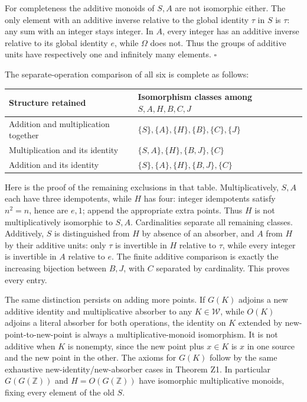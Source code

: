 \documentclass[
]{article}
\newcounter{none} %
\begin{document}
For completeness the additive monoids of \(S,A\) are not isomorphic
either. The only element with an additive inverse relative to the global
identity \(\tau\) in \(S\) is \(\tau\): any sum with an integer stays
integer. In \(A\), every integer has an additive inverse relative to its
global identity \(e\), while \(\Omega\) does not. Thus the groups of
additive units have respectively one and infinitely many elements.
\(\square\)

The separate-operation comparison of all six is complete as follows:

{\def\LTcaptype{none} %
\begin{longtable}[]{@{}
  >{\raggedright\arraybackslash}p{}
  >{\raggedright\arraybackslash}p{}@{}}
\toprule\noalign{}
\begin{minipage}[b]{\linewidth}\raggedright
Structure retained
\end{minipage} & \begin{minipage}[b]{\linewidth}\raggedright
Isomorphism classes among \(S,A,H,B,C,J\)
\end{minipage} \\
\midrule\noalign{}
\endhead
\bottomrule\noalign{}
\endlastfoot
Addition and multiplication together &
\(\{S\},\{A\},\{H\},\{B\},\{C\},\{J\}\) \\
Multiplication and its identity & \(\{S,A\},\{H\},\{B,J\},\{C\}\) \\
Addition and its identity & \(\{S\},\{A\},\{H\},\{B,J\},\{C\}\) \\
\end{longtable}
}

Here is the proof of the remaining exclusions in that table.
Multiplicatively, \(S,A\) each have three idempotents, while \(H\) has
four: integer idempotents satisfy \(n^2=n\), hence are \(e,1\); append
the appropriate extra points. Thus \(H\) is not multiplicatively
isomorphic to \(S,A\). Cardinalities separate all remaining classes.
Additively, \(S\) is distinguished from \(H\) by absence of an absorber,
and \(A\) from \(H\) by their additive units: only \(\tau\) is
invertible in \(H\) relative to \(\tau\), while every integer is
invertible in \(A\) relative to \(e\). The finite additive comparison is
exactly the increasing bijection between \(B,J\), with \(C\) separated
by cardinality. This proves every entry.

The same distinction persists on adding more points. If \(G(K)\) adjoins
a new additive identity and multiplicative absorber to any
\(K\in\mathcal W\), while \(O(K)\) adjoins a literal absorber for both
operations, the identity on \(K\) extended by new-point-to-new-point is
always a multiplicative-monoid isomorphism. It is not additive when
\(K\) is nonempty, since the new point plus \(x\in K\) is \(x\) in one
source and the new point in the other. The axioms for \(G(K)\) follow by
the same exhaustive new-identity/new-absorber cases in Theorem Z1. In
particular \(G(G(\mathbb Z))\) and \(H=O(G(\mathbb Z))\) have isomorphic
multiplicative monoids, fixing every element of the old \(S\).
\end{document}
